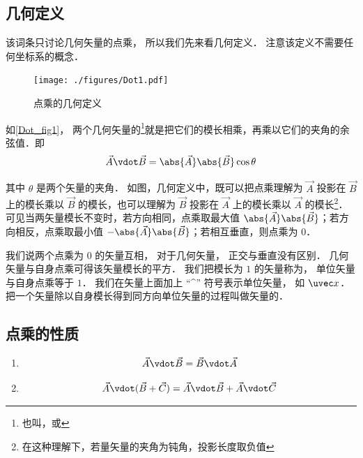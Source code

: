 

\subsection{几何定义}
该词条只讨论几何矢量的点乘， 所以我们先来看几何定义． 注意该定义不需要任何坐标系的概念．
\begin{figure}[th]
\centering
\texttt{[image: ./figures/Dot1.pdf]}
\caption{点乘的几何定义}\label{Dot_fig1}
\end{figure}

如\autoref{Dot_fig1}， 两个几何矢量的\footnote{也叫，或}就是把它们的模长相乘，再乘以它们的夹角的余弦值．即
\begin{equation}\label{Dot_eq1}
\vec A \vdot \vec B = \abs{\vec A} \abs{\vec B} \cos\theta 
\end{equation}

其中 $\theta$ 是两个矢量的夹角． 如图，几何定义中，既可以把点乘理解为 $\vec A$ 投影在 $\vec B$ 上的模长乘以 $\vec B$ 的模长，也可以理解为 $\vec B$ 投影在 $\vec A$ 上的模长乘以 $\vec A$ 的模长\footnote{在这种理解下，若量矢量的夹角为钝角，投影长度取负值}．可见当两矢量模长不变时，若方向相同，点乘取最大值 $\abs{\vec A}\abs{\vec B}$；若方向相反，点乘取最小值 $-\abs{\vec A}\abs{\vec B}$；若相互垂直，则点乘为 0．

我们说两个点乘为 0 的矢量互相， 对于几何矢量， 正交与垂直没有区别． 几何矢量与自身点乘可得该矢量模长的平方． 我们把模长为 $1$ 的矢量称为， 单位矢量与自身点乘等于 $1$． 我们在矢量上面加上 “\^{}” 符号表示单位矢量， 如 $\uvec x$． 把一个矢量除以自身模长得到同方向单位矢量的过程叫做矢量的．

\subsection{点乘的性质}

\begin{enumerate}
\item {}
\begin{equation}
\vec A \vdot \vec B = \vec B \vdot \vec A
\end{equation}

\item {}
\begin{equation}\label{Dot_eq3}
\vec A \vdot (\vec B + \vec C) = \vec A \vdot \vec B + \vec A \vdot \vec C
\end{equation}
\end{enumerate}

